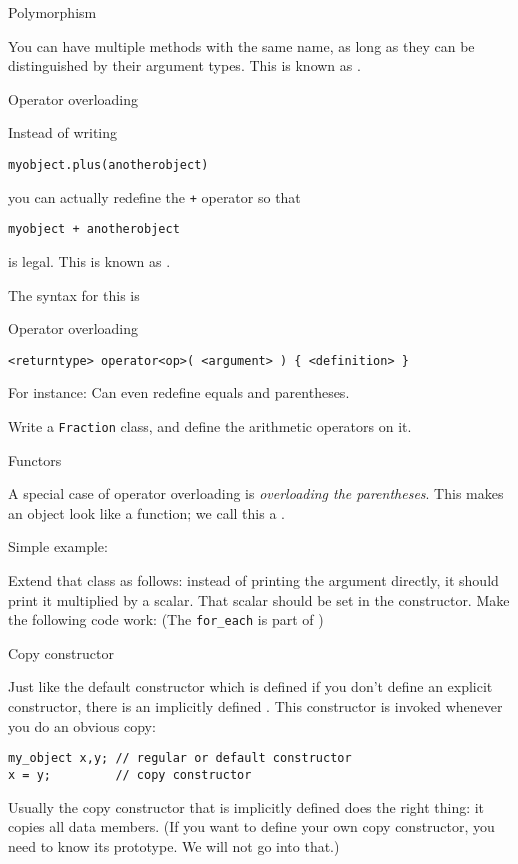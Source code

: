  {Polymorphism}

You can have multiple methods with the same name, as long as they can
be distinguished by their argument types. This is known as .

 {Operator overloading}
\label{sec:operatordef}

Instead of writing 
\begin{lstlisting}
myobject.plus(anotherobject)
\end{lstlisting}
you can actually redefine the \lstinline{+} operator so that
\begin{lstlisting}
myobject + anotherobject
\end{lstlisting}
is legal. This is known as .

The syntax for this is
\begin{block}{Operator overloading}
  \label{sl:object-operator}
\begin{lstlisting}
<returntype> operator<op>( <argument> ) { <definition> }
\end{lstlisting}
For instance:
%
%
Can even redefine equals and parentheses.
\end{block}

\begin{exercise}
  Write a \lstinline{Fraction} class, and define the arithmetic operators on it.
\end{exercise}

 {Functors}

A special case of operator overloading is
%
\emph{overloading the parentheses}. This makes an object look like a
function; we call this a .

Simple example:
%

\begin{exercise}
  \label{ex:functor2}
  Extend that class as follows: instead of printing the argument
  directly, it should print it multiplied by a scalar. That scalar
  should be set in the constructor. Make the following code work:
  (The \lstinline{for_each} is part of )
\end{exercise}


 {Copy constructor}

Just like the default constructor which is defined if you don't define
an explicit constructor, there is an implicitly defined
. This constructor is invoked whenever
you do an obvious copy:
\begin{lstlisting}
my_object x,y; // regular or default constructor
x = y;         // copy constructor
\end{lstlisting}
Usually the copy constructor that is implicitly defined does the right
thing: it copies all data members. (If you want to define your own copy
constructor, you need to know its prototype. We will not go into that.)

